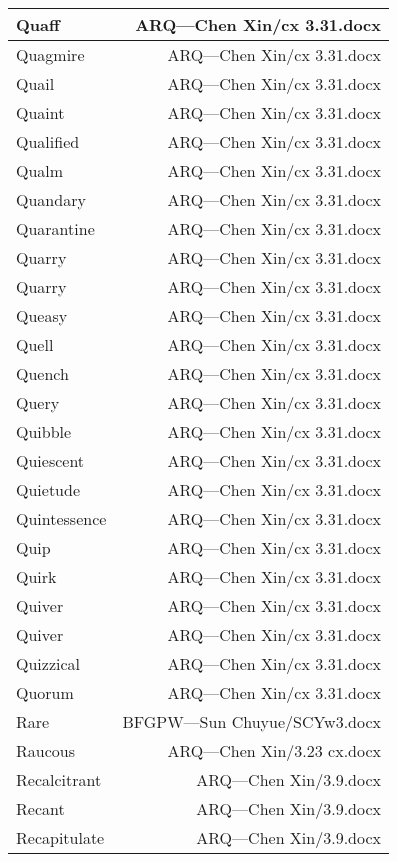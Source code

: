 \documentclass{article}
\begin{document}
\begin{center}
\begin{longtable}{|l|r|}
\hline
Quaff  &  ARQ---Chen Xin/cx 3.31.docx\\  
\hline
Quagmire  &  ARQ---Chen Xin/cx 3.31.docx\\  
\hline
Quail  &  ARQ---Chen Xin/cx 3.31.docx\\  
\hline
Quaint  &  ARQ---Chen Xin/cx 3.31.docx\\  
\hline
Qualified  &  ARQ---Chen Xin/cx 3.31.docx\\  
\hline
Qualm  &  ARQ---Chen Xin/cx 3.31.docx\\  
\hline
Quandary  &  ARQ---Chen Xin/cx 3.31.docx\\  
\hline
Quarantine  &  ARQ---Chen Xin/cx 3.31.docx\\  
\hline
Quarry  &  ARQ---Chen Xin/cx 3.31.docx\\  
\hline
Quarry  &  ARQ---Chen Xin/cx 3.31.docx\\  
\hline
Queasy  &  ARQ---Chen Xin/cx 3.31.docx\\  
\hline
Quell  &  ARQ---Chen Xin/cx 3.31.docx\\  
\hline
Quench  &  ARQ---Chen Xin/cx 3.31.docx\\  
\hline
Query  &  ARQ---Chen Xin/cx 3.31.docx\\  
\hline
Quibble  &  ARQ---Chen Xin/cx 3.31.docx\\  
\hline
Quiescent  &  ARQ---Chen Xin/cx 3.31.docx\\  
\hline
Quietude  &  ARQ---Chen Xin/cx 3.31.docx\\  
\hline
Quintessence  &  ARQ---Chen Xin/cx 3.31.docx\\  
\hline
Quip  &  ARQ---Chen Xin/cx 3.31.docx\\  
\hline
Quirk  &  ARQ---Chen Xin/cx 3.31.docx\\  
\hline
Quiver  &  ARQ---Chen Xin/cx 3.31.docx\\  
\hline
Quiver  &  ARQ---Chen Xin/cx 3.31.docx\\  
\hline
Quizzical  &  ARQ---Chen Xin/cx 3.31.docx\\  
\hline
Quorum  &  ARQ---Chen Xin/cx 3.31.docx\\  
\hline
Rare  &  BFGPW---Sun Chuyue/SCYw3.docx\\  
\hline
Raucous  &  ARQ---Chen Xin/3.23 cx.docx\\  
\hline
Recalcitrant  &  ARQ---Chen Xin/3.9.docx\\  
\hline
Recant  &  ARQ---Chen Xin/3.9.docx\\  
\hline
Recapitulate  &  ARQ---Chen Xin/3.9.docx\\  

\end{longtable}
\end{center}
\end{document}
